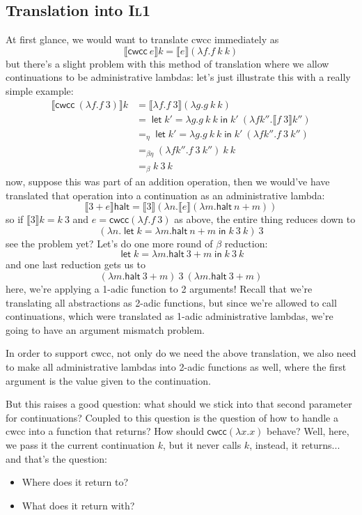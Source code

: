 \documentclass[11pt,a4paper]{article}
\newcommand {\coo} [1] {\ensuremath{\operatorname{\mathsf{#1}}}}
\newcommand{\Let}[1]{\coo{let} #1 \coo{in} }
\newcommand{\f}[1]{\textsc{#1}}
\newcommand{\g}[1]{\textsf{#1}}
\newcommand{\trans}[2]{\ensuremath{\mathcal{#1}\llbracket #2\rrbracket}}
\begin{document}
\begin{enumerate}[label=\textbf{Excercise \arabic*\ }]
\begin{enumerate}
\vspace{4mm}
\section*{Translation into \f{Il1}}
At first glance, we would want to translate \g{cwcc} immediately as
$$
\trans{}{\g{cwcc}~e} k = \trans{}{e}(\lambda f. f~k~k)
$$
but there's a slight problem with this method of translation where we allow continuations to be administrative lambdas: let's just illustrate this with a really simple example:
\begin{align*}
\trans{}{\g{cwcc}~(\lambda f. f~3)} k &= \trans{}{\lambda f. f~3}(\lambda g.g~k~k)\\
&= \Let{k' = \lambda g.g~k~k}{k'~(\lambda fk''. \trans{}{f~3} k'')} \\
&=_\eta \Let{k' = \lambda g.g~k~k}{k'~(\lambda fk''. f~3~ k'')} \\
&=_{\beta\eta} (\lambda fk''.f~3~k'')~k~k \\
&=_\beta k~3~k
\end{align*}
now, suppose this was part of an addition operation, then we would've have translated that operation into a continuation as an administrative lambda:
$$
\trans{}{3 + e} \g{halt} = \trans{}{3}(\lambda n. \trans{}{e} (\lambda m. \g{halt}~n+m))
$$
so if $\trans{}{3} k = k~3$ and $e = \g{cwcc}(\lambda f. f~3)$ as above, the entire thing reduces down to
$$
(\lambda n. \Let{k = \lambda m. \g{halt}~n+m}{k~3~k})~3
$$
see the problem yet? Let's do one more round of $\beta$ reduction:
$$
\Let{k = \lambda m. \g{halt}~3+m}{k~3~k}
$$
and one last reduction gets us to
$$
(\lambda m. \g{halt}~3+m)~3 ~ (\lambda m. \g{halt}~3+m)
$$
here, we're applying a 1-adic function to 2 arguments! Recall that we're translating all abstractions as 2-adic functions, but since we're allowed to call continuations, which were translated as 1-adic administrative lambdas, we're going to have an argument mismatch problem. 


In order to support \g{cwcc}, not only do we need the above translation, we also need to make all administrative lambdas into 2-adic functions as well, where the first argument is the value given to the continuation.%

But this raises a good question: what should we stick into that second parameter for continuations? Coupled to this question is the question of how to handle a \g{cwcc} into a function that returns? How should $\g{cwcc} (\lambda x.x)$ behave? Well, here, we pass it the current continuation $k$, but it never calls $k$, instead, it returns... and that's the question:
\begin{itemize}
\item Where does it return to?
\item What does it return with?
\end{itemize}


\end{enumerate}
\end{enumerate}
\end{document}
